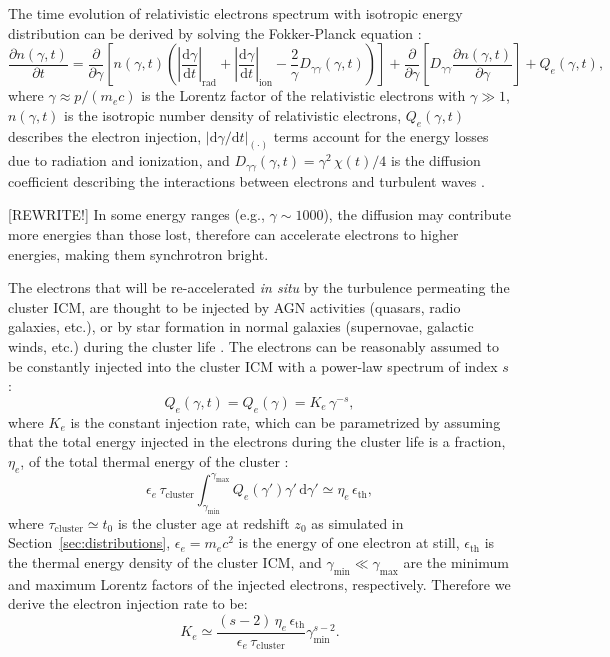 \documentclass[modern]{aastex61}
\newcommand{\R}[1]{\mathrm{#1}}
\newcommand{\D}[1]{\R{d} #1}
\newcommand{\diff}[2]{\frac{\D{#1}}{\D{#2}}}
\newcommand{\pdiff}[2]{\frac{\partial #1}{\partial #2}}
\begin{document}
The time evolution of relativistic electrons spectrum with isotropic energy
distribution can be derived by solving the Fokker-Planck equation
\citep{eilek1991,schlickeiser2002}:
\begin{equation}
  \label{eq:fokkerplanck}
  \pdiff{n(\gamma,t)}{t} = \pdiff{}{\gamma} \left[ n(\gamma,t) \left(
      \left| \diff{\gamma}{t} \right|_{\R{rad}} +
      \left| \diff{\gamma}{t} \right|_{\R{ion}} -
      \frac{2}{\gamma} D_{\gamma\gamma}(\gamma, t) \right) \right] +
    \pdiff{}{\gamma} \left[ D_{\gamma\gamma} \pdiff{n(\gamma,t)}{\gamma}
    \right] + Q_e(\gamma,t),
\end{equation}
where $\gamma \approx p / (m_e c)$ is the Lorentz factor of the
relativistic electrons with $\gamma \gg 1$,
$n(\gamma, t)$ is the isotropic number density of relativistic
electrons, $Q_e(\gamma, t)$ describes the electron injection,
$|\R{d}\gamma / \R{d}t|_{(\cdot)}$ terms account for the
energy losses due to radiation and ionization,
and $D_{\gamma\gamma}(\gamma, t) = \gamma^2\,\chi(t) / 4$ is the
diffusion coefficient describing the interactions between electrons
and turbulent waves \citep{brunetti2011}.

[REWRITE!]
In some energy ranges (e.g., $\gamma \sim 1000$), the diffusion may
contribute more energies than those lost, therefore can accelerate electrons
to higher energies, making them synchrotron bright.

The electrons that will be re-accelerated \emph{in situ}
by the turbulence permeating the cluster ICM, are thought to be
injected by AGN activities (quasars, radio galaxies, etc.), or by
star formation in normal galaxies (supernovae, galactic winds, etc.)
during the cluster life \citep[see][for a review]{blasi2007rev}.
The electrons can be reasonably assumed to be constantly injected
into the cluster ICM with a power-law spectrum of index $s$
\citep{cassano2005,sarazin1999}:
\begin{equation}
  \label{eq:electron-inj}
  Q_e(\gamma, t) = Q_e(\gamma) = K_e \,\gamma^{-s},
\end{equation}
where $K_e$ is the constant injection rate,
which can be parametrized
by assuming that the total energy injected in the electrons during
the cluster life is a fraction, $\eta_e$, of the total thermal energy
of the cluster \citep{cassano2005}:
\begin{equation}
  \label{eq:injrate-param}
  \epsilon_e \,\tau_{\R{cluster}} \int_{\gamma_{\R{min}}}^{\gamma_{\R{max}}}
  Q_e(\gamma') \gamma' \,\D{\gamma'} \simeq \eta_e \,\epsilon_{\R{th}},
\end{equation}
where $\tau_{\R{cluster}} \simeq t_0$ is the cluster age at redshift
$z_0$ as simulated in Section~\ref{sec:distributions},
$\epsilon_e = m_e c^2$ is the energy of one electron at still,
$\epsilon_{\R{th}}$ is the thermal energy density of the cluster ICM,
and $\gamma_{\R{min}} \ll \gamma_{\R{\max}}$ are the minimum and maximum
Lorentz factors of the injected electrons, respectively.
Therefore we derive the electron injection rate to be:
\begin{equation}
  \label{eq:injrate}
  K_e \simeq \frac{(s-2)\,\eta_e\,\epsilon_{\R{th}}}{\epsilon_e\,\tau_{\R{cluster}}}
    \gamma_{\R{min}}^{s-2}.
\end{equation}
\end{document}
